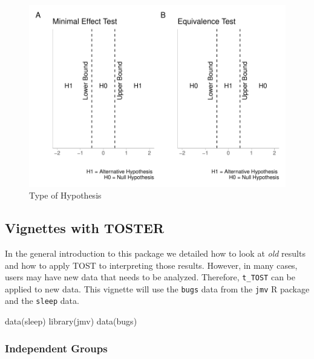 \documentclass[]{interact}
\theoremstyle{plain}%
\theoremstyle{definition}
\theoremstyle{remark}
\newenvironment{Shaded}{\begin{snugshade}}{\end{snugshade}}
\newcommand{\FunctionTok}[1]{\textcolor[rgb]{0.00,0.00,0.00}{#1}}
\newcommand{\NormalTok}[1]{#1}
\newcommand{\StringTok}[1]{\textcolor[rgb]{0.31,0.60,0.02}{#1}}
\begin{document}
\begin{figure}
\centering
\includegraphics{Avocado_Update_files/figure-latex/hypplot-1.pdf}
\caption{Type of Hypothesis}
\end{figure}

\hypertarget{vignettes-with-toster}{%
\subsection{Vignettes with TOSTER}\label{vignettes-with-toster}}

In the general introduction to this package we detailed how to look at
\emph{old} results and how to apply TOST to interpreting those results.
However, in many cases, users may have new data that needs to be
analyzed. Therefore, \texttt{t\_TOST} can be applied to new data. This
vignette will use the \texttt{bugs} data from the \texttt{jmv} R package
and the \texttt{sleep} data.

\begin{Shaded}
\begin{Highlighting}[]
\FunctionTok{data}\NormalTok{(}\StringTok{\textquotesingle{}sleep\textquotesingle{}}\NormalTok{)}
\FunctionTok{library}\NormalTok{(jmv)}
\FunctionTok{data}\NormalTok{(}\StringTok{\textquotesingle{}bugs\textquotesingle{}}\NormalTok{)}
\end{Highlighting}
\end{Shaded}

\hypertarget{independent-groups}{%
\subsubsection{Independent Groups}\label{independent-groups}}
\end{document}
